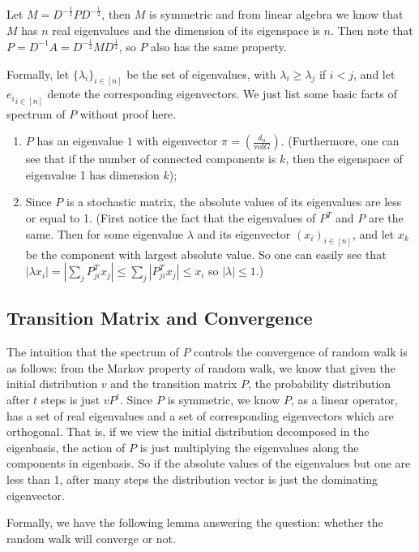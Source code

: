 Let $M=D^{-\frac{1}{2}}PD^{-\frac{1}{2}}$, then $M$ is symmetric and
from linear algebra we know that $M$ has $n$ real eigenvalues and
the dimension of its eigenspace is $n$. Then note that
$P=D^{-1}A=D^{-\frac{1}{2}}MD^\frac{1}{2}$, so $P$ also has the same
property.

Formally, let $\{\lambda_i\}_{i\in[n]}$ be the set of eigenvalues,
with $\lambda_i\geq \lambda_j$ if $i<j$, and let ${e_i}_{i\in[n]}$
denote the corresponding eigenvectors. We just list some basic facts
of spectrum of $P$ without proof here.

\begin{enumerate}
\item $P$ has an eigenvalue $1$ with eigenvector $\pi=(\frac
{d_u}{\text{vol}G})$. (Furthermore, one can see that if the number
of connected components is $k$, then the eigenspace of eigenvalue 1
has dimension $k$);
\item Since $P$ is a stochastic matrix, the absolute values of its
eigenvalues are less or equal to 1. (First notice the fact that the
eigenvalues of $P^T$ and $P$ are the same. Then for some eigenvalue
$\lambda$ and its eigenvector $(x_i)_{i\in [n]}$, and let $x_k$ be
the component with largest absolute value. So one can easily see
that $|\lambda x_i|=|\sum_j P^T_{ji} x_j|\leq \sum_j |P^T_{ji} x_j|
\leq x_i$ so $|\lambda|\leq 1$.)
\end{enumerate}

\subsection{Transition Matrix and Convergence}

The intuition that the spectrum of $P$ controls the convergence of
random walk is as follows: from the Markov property of random walk,
we know that given the initial distribution $v$ and the transition
matrix $P$, the probability distribution after $t$ steps is just
$vP^t$. Since $P$ is symmetric, we know $P$, as a linear operator,
has a set of real eigenvalues and a set of corresponding
eigenvectors which are orthogonal. That is, if we view the initial
distribution decomposed in the eigenbasis, the action of $P$ is just
multiplying the eigenvalues along the components in eigenbasis. So
if the absolute values of the eigenvalues but one are less than 1,
after many steps the distribution vector is just the dominating
eigenvector.

Formally, we have the following lemma answering the question:
whether the random walk will converge or not.

